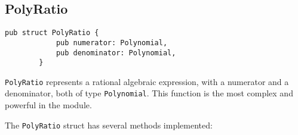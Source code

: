 

\subsection{PolyRatio}\label{subsec:polyratio}

\begin{minipage}{\linewidth}
    \begin{lstlisting}[caption={The \texttt{PolyRatio} struct}, label={lst:polyratio}]
        pub struct PolyRatio {
            pub numerator: Polynomial,
            pub denominator: Polynomial,
        }
    \end{lstlisting}
\end{minipage}

\verb|PolyRatio| represents a rational algebraic expression, with a numerator and a denominator, both of type \verb|Polynomial|. This function is the most complex and powerful in the module.

The \verb|PolyRatio| struct has several methods implemented:

